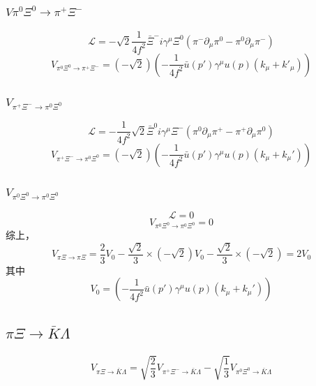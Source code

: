 \subsubsection{$V\pi^{0}\Xi^{0}\to\pi^{+}\Xi^{-}$}
\begin{equation}
	\mathcal{L}=-\sqrt{2}\frac{1}{4f^2}\bar{\Xi}^{-}i\gamma^{\mu}\Xi^{0}(\pi^{-}\partial_{\mu}\pi^{0}-\pi^{0}\partial_{\mu}\pi^{-})
\end{equation}
\begin{equation}
	V_{\pi^{0}\Xi^{0}\to\pi^{+}\Xi^{-}}=\left(-\sqrt{2}\right)\left(-\frac{1}{4f^2}\bar{u}(p')\gamma^{\mu}u(p)(k_{\mu}+k'_{\mu})\right)
\end{equation}
\subsubsection{$V_{\pi^{+}\Xi^{-}\to\pi^{0}\Xi^{0}}$}
\begin{equation}
	\mathcal{L}=-\frac{1}{4f^2}\sqrt{2}\bar{\Xi}^{0}i\gamma^{\mu}\Xi^{-}(\pi^{0}\partial_{\mu}\pi^{+}-\pi^{+}\partial_{\mu}\pi^{0})
\end{equation}
\begin{equation}
	V_{\pi^{+}\Xi^{-}\to\pi^{0}\Xi^{0}}={\left(-\sqrt{2}\right)\left(-\frac{1}{4f^2}\bar{u}(p')\gamma^{\mu}u(p)(k_{\mu}+k_{\mu}')\right)}
\end{equation}
\subsubsection{$V_{\pi^{0}\Xi^{0}\to\pi^{0}\Xi^{0}}$}
\begin{equation}
	\mathcal{L}=0
\end{equation}
\begin{equation}
	V_{\pi^{0}\Xi^{0}\rightarrow\pi^{0}\Xi^{0}}=0
\end{equation}
综上，
\begin{equation}
	V_{\pi\Xi\rightarrow\pi\Xi}=\frac{2}{3}V_{0}-\frac{\sqrt{2}}{3}\times(-\sqrt{2})V_{0}-\frac{\sqrt{2}}{3}\times(-\sqrt{2})=2V_{0}
\end{equation}
其中
\begin{equation}
V_{0}=\left(-\frac{1}{4f^2}\bar{u}(p')\gamma^{\mu}u(p)(k_{\mu}+k_{\mu}')\right)
\end{equation}
\subsection{$\pi\Xi\to \bar{K}\Lambda$}
\begin{equation}
	V_{\pi\Xi\to \bar{K}\Lambda}=\sqrt{\frac{2}{3}}V_{\pi^{+}\Xi^{-}\rightarrow \bar{K}\Lambda}-\sqrt{\frac{1}{3}}V_{\pi^{0}\Xi^{0}\rightarrow \bar{K}\Lambda}
\end{equation}
